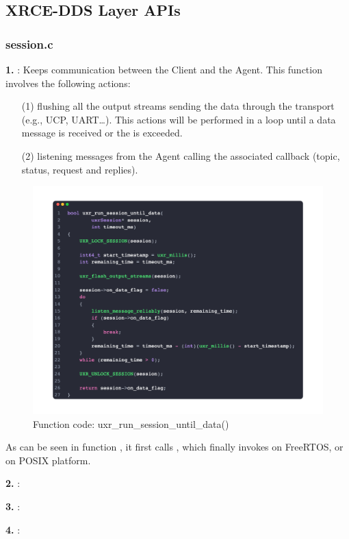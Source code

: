 \subsection{XRCE-DDS Layer APIs}
\subsubsection{session.c}

\textbf{1. }: Keeps communication between the Client and the Agent. This function involves the following actions:
\begin{itemize}
    \item [(1)] flushing all the output streams sending the data through the transport (e.g., UCP, UART\dots). This actions will be performed in a loop until a data message is received or the  is exceeded.
    \item [(2)] listening messages from the Agent calling the associated callback (topic, status, request and replies).
\end{itemize}

\begin{figure}[htbp!]
    \centering
    \includegraphics[width=1\linewidth]{Sec/Implementation/uxr/fig/uxr_run_session_until_data.png}
    \caption{Function code: uxr\_run\_session\_until\_data()}
    \vspace{-0.1in}
\end{figure}

As can be seen in function , it first calls , which finally invokes  on FreeRTOS, or  on POSIX platform.

\textbf{2. }:

\textbf{3. }:

\textbf{4. }: